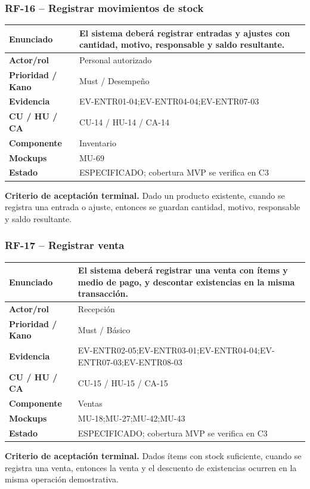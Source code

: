 \documentclass[11pt,a4paper,twoside]{article}
\begin{document}
\subsubsection{RF-16 -- Registrar movimientos de stock}
\begin{tabularx}{\textwidth}{|>{\bfseries}p{3.2cm}|X|}\hline
Enunciado & El sistema deberá registrar entradas y ajustes con cantidad, motivo, responsable y saldo resultante. \\ \hline
Actor/rol & Personal autorizado \\ \hline
Prioridad / Kano & Must / Desempeño \\ \hline
Evidencia & EV-ENTR01-04;EV-ENTR04-04;EV-ENTR07-03 \\ \hline
CU / HU / CA & CU-14 / HU-14 / CA-14 \\ \hline
Componente & Inventario \\ \hline
Mockups & MU-69 \\ \hline
Estado & ESPECIFICADO; cobertura MVP se verifica en C3 \\ \hline
\end{tabularx}
\textbf{Criterio de aceptación terminal.} Dado un producto existente, cuando se registra una entrada o ajuste, entonces se guardan cantidad, motivo, responsable y saldo resultante.
\subsubsection{RF-17 -- Registrar venta}
\begin{tabularx}{\textwidth}{|>{\bfseries}p{3.2cm}|X|}\hline
Enunciado & El sistema deberá registrar una venta con ítems y medio de pago, y descontar existencias en la misma transacción. \\ \hline
Actor/rol & Recepción \\ \hline
Prioridad / Kano & Must / Básico \\ \hline
Evidencia & EV-ENTR02-05;EV-ENTR03-01;EV-ENTR04-04;EV-ENTR07-03;EV-ENTR08-03 \\ \hline
CU / HU / CA & CU-15 / HU-15 / CA-15 \\ \hline
Componente & Ventas \\ \hline
Mockups & MU-18;MU-27;MU-42;MU-43 \\ \hline
Estado & ESPECIFICADO; cobertura MVP se verifica en C3 \\ \hline
\end{tabularx}
\textbf{Criterio de aceptación terminal.} Dados ítems con stock suficiente, cuando se registra una venta, entonces la venta y el descuento de existencias ocurren en la misma operación demostrativa.
\end{document}
